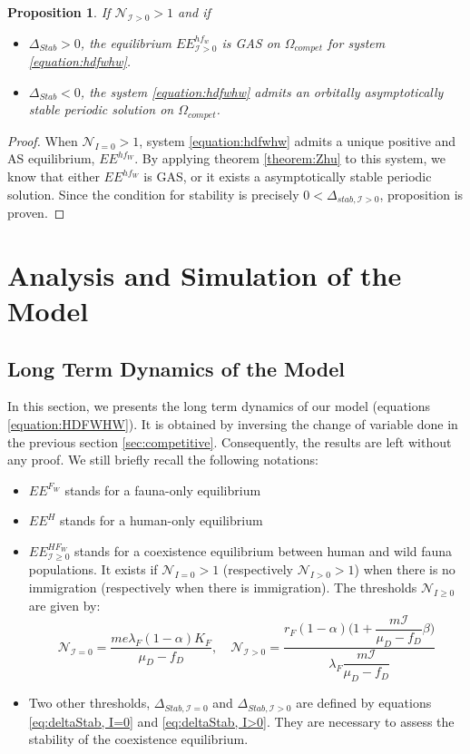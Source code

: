 \documentclass{article}
\newcommand{\lfw}{\lambda_{F}}
\newcommand{\lfw}{\lambda_{F}}
\newcommand{\cI}{\mathcal{I}}
\newcommand{\N}{\mathcal{N}}
\newcommand{\vtrois}[1]{\textcolor{OliveGreen}{#1}}
\newtheorem{prop}[theorem]{Proposition}
\theoremstyle{definition}
\theoremstyle{remark}
\begin{document}
\begin{prop} \label{prop:limitCycle, cI>0}
If $\mathcal{N}_{\cI > 0} > 1$ and if 

\begin{itemize}
\item $\Delta_{Stab} > 0$, the equilibrium $EE^{hf_w}_{\cI >0}$ is GAS on $\Omega_{compet}$ for system \eqref{equation:hdfwhw}.
\item $\Delta_{Stab} < 0$, the system \eqref{equation:hdfwhw} admits an orbitally asymptotically stable periodic solution on $\Omega_{compet}$.
\end{itemize}
\end{prop}

\begin{proof}
When $\mathcal{N}_{I =0} > 1$, system \eqref{equation:hdfwhw} admits a unique positive and AS equilibrium, $EE^{hf_W}$. By applying theorem \ref{theorem:Zhu} to this system, we know that either $EE^{hf_W}$ is GAS, or it exists a asymptotically stable periodic solution. Since the condition for stability is precisely $0 < \Delta_{stab, \cI > 0}$, proposition is proven. 
\end{proof}

\section{\vtrois{Analysis and Simulation of the Model}}


\subsection{Long Term Dynamics of the Model}

\vtrois{
In this section, we presents the long term dynamics of our model (equations \eqref{equation:HDFWHW}). It is obtained by inversing the change of variable done in the previous section \ref{sec:competitive}. Consequently, the results are left without any proof. We still briefly recall the following notations:
\begin{itemize}
\item $EE^{F_W}$ stands for a fauna-only equilibrium
\item $EE^{H}$ stands for a human-only equilibrium
\item $EE^{HF_W}_{\cI \geq 0}$ stands for a coexistence equilibrium between human and wild fauna populations. It exists if $\N_{I = 0} > 1$ (respectively $\N_{I > 0} > 1$) when there is no immigration (respectively when there is immigration). The thresholds $\N_{I \geq 0}$ are given by:
$$
\mathcal{N}_{\cI = 0} = \dfrac{m e \lfw (1-\alpha)K_F}{\mu_D - f_D}, \quad \mathcal{N}_{\cI >0} =\dfrac{r_F(1-\alpha)\Big({1 + \dfrac{m\cI}{\mu_D - f_D}\beta\Big)}}{\lfw\dfrac{m\cI}{\mu_D - f_D}}
$$
\item Two other thresholds, $\Delta_{Stab, \cI = 0}$ and $\Delta_{Stab, \cI > 0}$ are defined by equations \eqref{eq:deltaStab, I=0} and \eqref{eq:deltaStab, I>0}. They are necessary to assess the stability of the coexistence equilibrium.
\end{itemize}
}
\end{document}
